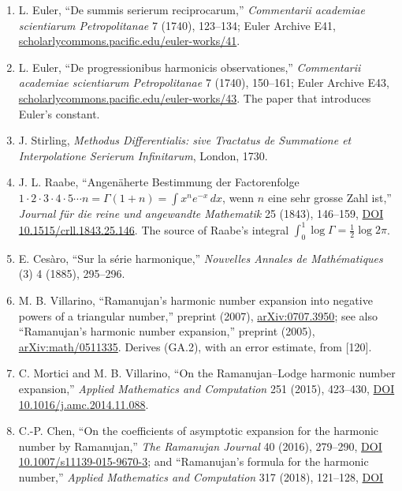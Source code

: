\documentclass[
  11pt,
]{book}
\begin{document}
\begin{enumerate}
\item
  L. Euler, ``De summis serierum reciprocarum,'' \emph{Commentarii
  academiae scientiarum Petropolitanae} 7 (1740), 123--134; Euler
  Archive E41,
  \href{https://scholarlycommons.pacific.edu/euler-works/41/}{scholarlycommons.pacific.edu/euler-works/41}.
\item
  L. Euler, ``De progressionibus harmonicis observationes,''
  \emph{Commentarii academiae scientiarum Petropolitanae} 7 (1740),
  150--161; Euler Archive E43,
  \href{https://scholarlycommons.pacific.edu/euler-works/43/}{scholarlycommons.pacific.edu/euler-works/43}.
  The paper that introduces Euler's constant.
\item
  J. Stirling, \emph{Methodus Differentialis: sive Tractatus de
  Summatione et Interpolatione Serierum Infinitarum}, London, 1730.
\item
  J. L. Raabe, ``Angenäherte Bestimmung der Factorenfolge
  \(1\cdot2\cdot3\cdot4\cdot5\cdots n=\Gamma(1+n)=\int x^ne^{-x}\,dx\),
  wenn \(n\) eine sehr grosse Zahl ist,'' \emph{Journal für die reine
  und angewandte Mathematik} 25 (1843), 146--159,
  \href{https://doi.org/10.1515/crll.1843.25.146}{DOI
  10.1515/crll.1843.25.146}. The source of Raabe's integral
  \(\int_0^1\log\Gamma=\tfrac12\log2\pi\).
\item
  E. Cesàro, ``Sur la série harmonique,'' \emph{Nouvelles Annales de
  Mathématiques} (3) 4 (1885), 295--296.
\item
  M. B. Villarino, ``Ramanujan's harmonic number expansion into negative
  powers of a triangular number,'' preprint (2007),
  \href{https://arxiv.org/abs/0707.3950}{arXiv:0707.3950}; see also
  ``Ramanujan's harmonic number expansion,'' preprint (2005),
  \href{https://arxiv.org/abs/math/0511335}{arXiv:math/0511335}. Derives
  (GA.2), with an error estimate, from {[}120{]}.
\item
  C. Mortici and M. B. Villarino, ``On the Ramanujan--Lodge harmonic
  number expansion,'' \emph{Applied Mathematics and Computation} 251
  (2015), 423--430, \href{https://doi.org/10.1016/j.amc.2014.11.088}{DOI
  10.1016/j.amc.2014.11.088}.
\item
  C.-P. Chen, ``On the coefficients of asymptotic expansion for the
  harmonic number by Ramanujan,'' \emph{The Ramanujan Journal} 40
  (2016), 279--290, \href{https://doi.org/10.1007/s11139-015-9670-3}{DOI
  10.1007/s11139-015-9670-3}; and ``Ramanujan's formula for the harmonic
  number,'' \emph{Applied Mathematics and Computation} 317 (2018),
  121--128, \href{https://doi.org/10.1016/j.amc.2017.08.053}{DOI
}
\end{enumerate}
\end{document}
